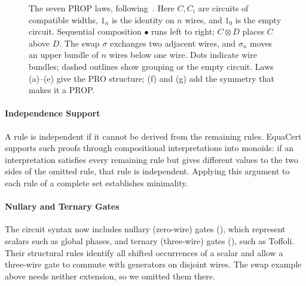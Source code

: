 \documentclass[acmsmall,screen,nonacm]{acmart}
\begin{document}
\begin{figure}[!htbp]
\centering

\caption{The seven PROP laws, following~\cite[Fig.~1]{clement2026realcliffordch}.
Here $C,C_i$ are circuits of compatible widths, $1_n$ is the identity
on $n$ wires, and $1_0$ is the empty circuit. Sequential composition
$\bullet$ runs left to right; $C\otimes D$ places $C$ above $D$.
The swap $\sigma$ exchanges two adjacent wires, and $\sigma_n$ moves
an upper bundle of $n$ wires below one wire. Dots indicate wire
bundles; dashed outlines show grouping or the empty circuit.
Laws (a)--(e) give the PRO structure; (f) and (g) add the symmetry
that makes it a PROP.}
\label{fig:equacert-structural}
\end{figure}

\paragraph{Independence Support}
A rule is independent if it cannot be derived from the remaining
rules. EquaCert supports such proofs through compositional
interpretations into monoids: if an interpretation satisfies every
remaining rule but gives different values to the two sides of the
omitted rule, that rule is independent. Applying this argument to
each rule of a complete set establishes minimality.

\paragraph{Nullary and Ternary Gates}
The circuit syntax now includes nullary (zero-wire) gates
(), which represent scalars such as global phases, and
ternary (three-wire) gates (), such as Toffoli. Their
structural rules identify all shifted occurrences of a scalar and
allow a three-wire gate to commute with generators on disjoint wires.
The swap example above needs neither extension, so we omitted them
there.

\end{document}
